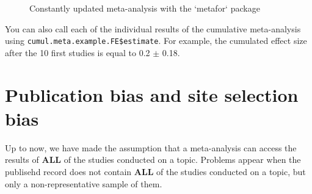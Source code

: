 \documentclass[
]{book}
\newenvironment{Shaded}{\begin{snugshade}}{\end{snugshade}}
\newcommand{\AttributeTok}[1]{\textcolor[rgb]{0.77,0.63,0.00}{#1}}
\newcommand{\FunctionTok}[1]{\textcolor[rgb]{0.00,0.00,0.00}{#1}}
\newcommand{\NormalTok}[1]{#1}
\newcommand{\OtherTok}[1]{\textcolor[rgb]{0.56,0.35,0.01}{#1}}
\newcommand{\SpecialCharTok}[1]{\textcolor[rgb]{0.00,0.00,0.00}{#1}}
\newcommand{\StringTok}[1]{\textcolor[rgb]{0.31,0.60,0.02}{#1}}
\theoremstyle{definition}
\theoremstyle{definition}
\theoremstyle{definition}
\theoremstyle{definition}
\theoremstyle{remark}
\begin{document}
\begin{Shaded}
\end{Shaded}

\begin{figure}[htbp]

{\centering {}

}

\caption{Constantly updated meta-analysis with the `metafor` package}\label{fig:cumWMAEmetafor}
\end{figure}

You can also call each of the individual results of the cumulative meta-analysis using \texttt{cumul.meta.example.FE\$estimate}.
For example, the cumulated effect size after the 10 first studies is equal to 0.2 \(\pm\) 0.18.

\hypertarget{publication-bias-and-site-selection-bias}{%
\section{Publication bias and site selection bias}\label{publication-bias-and-site-selection-bias}}

Up to now, we have made the assumption that a meta-analysis can access the results of \textbf{ALL} of the studies conducted on a topic.
Problems appear when the publisehd record does not contain \textbf{ALL} of the studies conducted on a topic, but only a non-representative sample of them.
\end{document}
